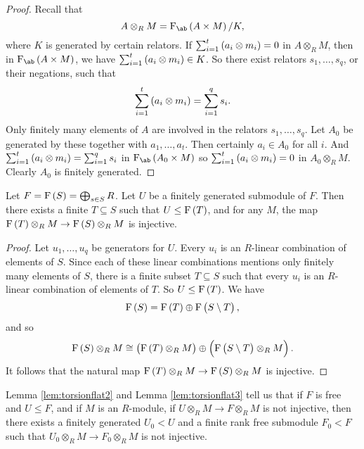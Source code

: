 \begin{proof}
Recall that
$$ A \otimes_R M = \F_{\ab}\br{A \times M} / K, $$
where $ K $ is generated by certain relators. If $ \sum_{i = 1}^t \br{a_i \otimes m_i} = 0 $ in $ A \otimes_R M $, then in $ \F_{\ab}\br{A \times M} $, we have $ \sum_{i = 1}^t \br{a_i \otimes m_i} \in K $. So there exist relators $ s_1, \dots, s_q $, or their negations, such that
$$ \sum_{i = 1}^t \br{a_i \otimes m_i} = \sum_{i = 1}^q s_i. $$
Only finitely many elements of $ A $ are involved in the relators $ s_1, \dots, s_q $. Let $ A_0 $ be generated by these together with $ a_1, \dots, a_t $. Then certainly $ a_i \in A_0 $ for all $ i $. And $ \sum_{i = 1}^t \br{a_i \otimes m_i} = \sum_{i = 1}^q s_i $ in $ \F_{\ab}\br{A_0 \times M} $ so $ \sum_{i = 1}^t \br{a_i \otimes m_i} = 0 $ in $ A_0 \otimes_R M $. Clearly $ A_0 $ is finitely generated.
\end{proof}


\begin{lemma}
\label{lem:torsionflat3}
Let $ F = \F\br{S} = \bigoplus_{s \in S} R $. Let $ U $ be a finitely generated submodule of $ F $. Then there exists a finite $ T \subseteq S $ such that $ U \le \F\br{T} $, and for any $ M $, the map $ \F\br{T} \otimes_R M \to \F\br{S} \otimes_R M $ is injective.
\end{lemma}

\begin{proof}
Let $ u_1, \dots, u_q $ be generators for $ U $. Every $ u_i $ is an $ R $-linear combination of elements of $ S $. Since each of these linear combinations mentions only finitely many elements of $ S $, there is a finite subset $ T \subseteq S $ such that every $ u_i $ is an $ R $-linear combination of elements of $ T $. So $ U \le \F\br{T} $. We have
$$ \F\br{S} = \F\br{T} \oplus \F\br{S \setminus T}, $$
and so
$$ \F\br{S} \otimes_R M \cong \br{\F\br{T} \otimes_R M} \oplus \br{\F\br{S \setminus T} \otimes_R M}. $$
It follows that the natural map $ \F\br{T} \otimes_R M \to \F\br{S} \otimes_R M $ is injective.
\end{proof}

\pagebreak

Lemma \ref{lem:torsionflat2} and Lemma \ref{lem:torsionflat3} tell us that if $ F $ is free and $ U \le F $, and if $ M $ is an $ R $-module, if $ U \otimes_R M \to F \otimes_R M $ is not injective, then there exists a finitely generated $ U_0 < U $ and a finite rank free submodule $ F_0 < F $ such that $ U_0 \otimes_R M \to F_0 \otimes_R M $ is not injective.

